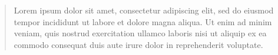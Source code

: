
\begin{abstract}
Lorem ipsum dolor sit amet, consectetur adipiscing elit, sed do eiusmod
tempor incididunt ut labore et dolore magna aliqua. Ut enim ad minim
veniam, quis nostrud exercitation ullamco laboris nisi ut aliquip ex ea
commodo consequat duis aute irure dolor in reprehenderit voluptate.
\end{abstract}

